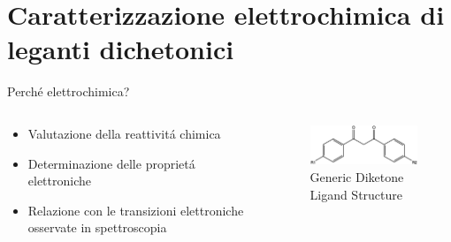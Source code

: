 \documentclass{beamer}
\begin{document}
\section{Caratterizzazione elettrochimica di leganti dichetonici}

\begin{frame}{Perché elettrochimica?}
	\begin{columns}
		\begin{column}{0.5\textwidth}
			\begin{itemize}
				\item Valutazione della reattivitá chimica
				\item Determinazione delle proprietá elettroniche
				\item Relazione con le transizioni elettroniche osservate in spettroscopia
			\end{itemize}
		\end{column}
		\hspace{-1cm}
		\begin{column}{0.5\textwidth}
			\begin{center}
				\begin{itemize}
					\begin{figure}[h!]
						\hspace{-1cm}
						\includegraphics[width=6cm,keepaspectratio]{../Structures/electrochemistry-generic.eps}
						\caption{Generic Diketone Ligand Structure}
					\end{figure}
				\end{itemize}
			\end{center}
		\end{column}
	\end{columns}
\end{frame}
\end{document}

